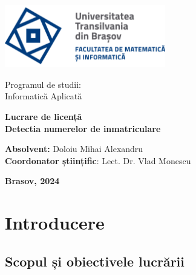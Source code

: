 \documentclass[12pt]{article}
\begin{document}
\begin{titlepage}

    \begin{minipage}{0.6\textwidth}
        \includegraphics[width=7cm]{logo_ro-RO.png}
    \end{minipage}
    \begin{minipage}{0.3\textwidth}
        \center
        {Programul de studii: \\ Informatic\u{a} Aplicat\u{a}}
    \end{minipage}
    
    \vspace*{5 cm} 

    \begin{center}
            {\Large \textbf{Lucrare de licență \\ Detectia numerelor de inmatriculare}}\\[2 cm]        
    \end{center}

    \vspace*{2 cm} 
    
    {\raggedright \normalsize \textbf{Absolvent:} Doloiu Mihai Alexandru \\ \textbf{Coordonator științific}: Lect. Dr. Vlad Monescu}
    
    \vspace*{\fill} 
    \begin{center}
        {\Large \centering \textbf{Brasov, 2024}}
    \end{center}
\end{titlepage}

\tableofcontents

\listoffigures

\newpage

\section{Introducere}

\subsection{Scopul și obiectivele lucrării}
\end{document}
